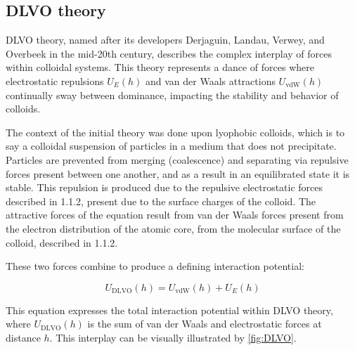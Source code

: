 
\subsection{DLVO theory}



DLVO theory, named after its developers Derjaguin, Landau, Verwey, and Overbeek in the mid-20th century, describes the complex interplay of forces within colloidal systems. This theory represents a dance of forces where electrostatic repulsions \( U_E(h) \) and van der Waals attractions \( U_{\text{vdW}}(h) \) continually sway between dominance, impacting the stability and behavior of colloids.\cite{israelachvili2011intermolecular} \cite{Origin2V} \cite{DERJAGUINORIGIN}


The context of the initial theory was done upon lyophobic colloids, which is to say a colloidal suspension of particles in a medium that does not precipitate. Particles are prevented from merging (coalescence) and separating via repulsive forces present between one another, and as a result in an equilibrated state it is stable. This repulsion is produced due to the repulsive electrostatic forces described in 1.1.2, present due to the surface charges of the colloid. The attractive forces of the equation result from van der Waals forces present from the electron distribution of the atomic core, from the molecular surface of the colloid, described in 1.1.2.\cite{ninhama1999progress}

These two forces combine to produce a defining interaction potential:

\begin{equation}
U_{\text{DLVO}}(h) = U_{\text{vdW}}(h) + U_{E}(h)
\end{equation}

This equation expresses the total interaction potential within DLVO theory, where \( U_{\text{DLVO}}(h) \) is the sum of van der Waals and electrostatic forces at distance \( h \). This interplay can be visually illustrated by \ref{fig:DLVO}.



